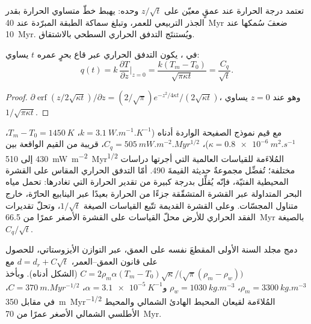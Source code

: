تعتمد درجة الحرارة عند عمقٍ معيّن على $z/\sqrt t$ وحده: يهبط خطّ
متساوي الحرارة بقدر الجذر التربيعي للعمر، وتبلغ سماكة الطبقة المبرّدة عند \qty{40}{Myr} ضعفَ
سُمكها عند \qty{10}{Myr}. ويُستنتَج التدفق الحراري السطحي بالاشتقاق.

\begin{proposition}\label{prop:b3:lithosphere-thermal-models:heat-flow}
في ، يكون التدفق الحراري عبر قاع بحرٍ عمره $t$
يساوي:
\[
  q(t) = k\,\frac{\partial T}{\partial z}\Big|_{z=0}
  = \frac{k(T_m - T_0)}{\sqrt{\pi\kappa t}} = \frac{C_q}{\sqrt t} .
\]
\end{proposition}

\begin{proof}
$\partial\operatorname{erf}(z/2\sqrt{\kappa t})/\partial z = (2/\sqrt\pi)
e^{-z^2/4\kappa t}/(2\sqrt{\kappa t})$، وهو عند $z = 0$ يساوي $1/\sqrt{\pi\kappa
t}$.
\end{proof}

مع قيم نموذج الصفيحة الواردة أدناه ($k = \qty{3.1}{W.m^{-1}.K^{-1}}$،
$T_m - T_0 = \qty{1450}{K}$، $\kappa = \qty{0.8e-6}{m^2.s^{-1}}$)، $C_q =
\qty{505}{mW.m^{-2}.Myr^{1/2}}$، قريبة من القيم الواقعة بين 430 إلى
\qty{510}{mW.m^{-2}.Myr^{1/2}} المُلاءَمة للقياسات العالمية التي أجرتها دراسات مختلفة؛
تُفضِّل مجموعةٌ حديثة القيمةَ \num{490}. أمّا التدفق الحراري المقاس على
القشرة المحيطية الفتيّة، فإنّه يُقلِّل بدرجة كبيرة من تقدير الحرارة التي تغادرها:
تحمل مياه البحر المتداولة عبر القشرة المتشقّقة جزءًا من الحرارة
بعيدًا عبر الينابيع الحارّة، خارج متناول المجسّات. وعلى القشرة القديمة تتّبع القياسات
الصيغة $1/\sqrt t$، وتحلّ تقديرات الفقد الحراري للأرض محلّ
القياسات على القشرة الأصغر عمرًا من \qty{66.5}{Myr} بالصيغة $C_q/\sqrt t$.

دمج مجلد السنة الأولى المقطعَ نفسه على العمق، عبر التوازن الأيزوستاتي، للحصول على
قانون العمق--العمر، $d = d_r + C\sqrt t$ مع $C = 2\rho_m\alpha(T_m -
T_0)\sqrt\kappa/\bigl(\sqrt\pi(\rho_m - \rho_w)\bigr)$ (الشكل أدناه). وبأخذ
$\rho_m = \qty{3300}{kg.m^{-3}}$، $\rho_w = \qty{1030}{kg.m^{-3}}$ و$\alpha =
\qty{3.1e-5}{K^{-1}}$، $C = \qty{370}{m.Myr^{-1/2}}$، في مقابل
\qty{350}{m.Myr^{-1/2}} المُلاءَمة لقيعان المحيط الهادئ الشمالي والمحيط الأطلسي الشمالي
الأصغر عمرًا من \qty{70}{Myr}.

